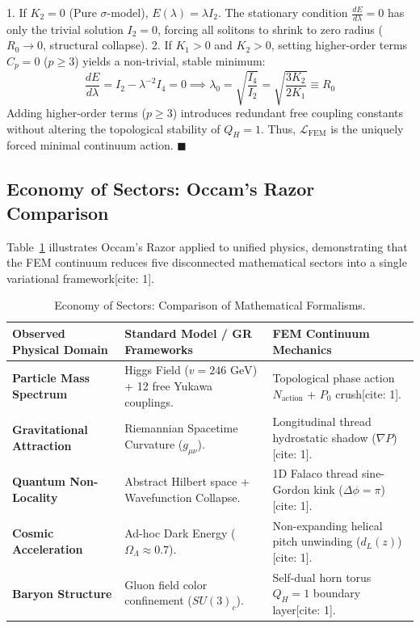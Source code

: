 \documentclass[11pt,a4paper]{article}
\begin{document}
	1. If $K_2 = 0$ (Pure $\sigma$-model), $E(\lambda) = \lambda I_2$. The stationary condition $\frac{dE}{d\lambda} = 0$ has only the trivial solution $I_2 = 0$, forcing all solitons to shrink to zero radius ($R_0 \to 0$, structural collapse).
	2. If $K_1 > 0$ and $K_2 > 0$, setting higher-order terms $C_p = 0$ ($p \ge 3$) yields a non-trivial, stable minimum:
	\begin{equation}
		\frac{dE}{d\lambda} = I_2 - \lambda^{-2} I_4 = 0 \implies \lambda_0 = \sqrt{\frac{I_4}{I_2}} = \sqrt{\frac{3 K_2}{2 K_1}} \equiv R_0
	\end{equation}
	Adding higher-order terms ($p \ge 3$) introduces redundant free coupling constants without altering the topological stability of $Q_H = 1$. Thus, $\mathcal{L}_{\text{FEM}}$ is the uniquely forced minimal continuum action. $\blacksquare$
	
	\subsection{Economy of Sectors: Occam's Razor Comparison}
	Table~\ref{tab:economy_sectors} illustrates Occam's Razor applied to unified physics, demonstrating that the FEM continuum reduces five disconnected mathematical sectors into a single variational framework[cite: 1].
	
	\begin{table}[H]
		\centering
		\caption{Economy of Sectors: Comparison of Mathematical Formalisms.}
		\label{tab:economy_sectors}
		\begin{tabular}{p{3.8cm}p{6.2cm}p{6.2cm}}
			\toprule
			\textbf{Observed Physical Domain} & \textbf{Standard Model / GR Frameworks} & \textbf{FEM Continuum Mechanics} \\
			\midrule
			\textbf{Particle Mass Spectrum} & Higgs Field ($v=246\text{ GeV}$) + 12 free Yukawa couplings. & Topological phase action $N_{\text{action}}$ + $P_0$ crush[cite: 1]. \\
			\addlinespace
			\textbf{Gravitational Attraction} & Riemannian Spacetime Curvature ($g_{\mu\nu}$). & Longitudinal thread hydrostatic shadow ($\nabla P$)[cite: 1]. \\
			\addlinespace
			\textbf{Quantum Non-Locality} & Abstract Hilbert space + Wavefunction Collapse. & 1D Falaco thread sine-Gordon kink ($\Delta\phi=\pi$)[cite: 1]. \\
			\addlinespace
			\textbf{Cosmic Acceleration} & Ad-hoc Dark Energy ($\Omega_\Lambda \approx 0.7$). & Non-expanding helical pitch unwinding ($d_L(z)$)[cite: 1]. \\
			\addlinespace
			\textbf{Baryon Structure} & Gluon field color confinement ($SU(3)_c$). & Self-dual horn torus $Q_H=1$ boundary layer[cite: 1]. \\
			\bottomrule
		\end{tabular}
	\end{table}
	
\end{document}
